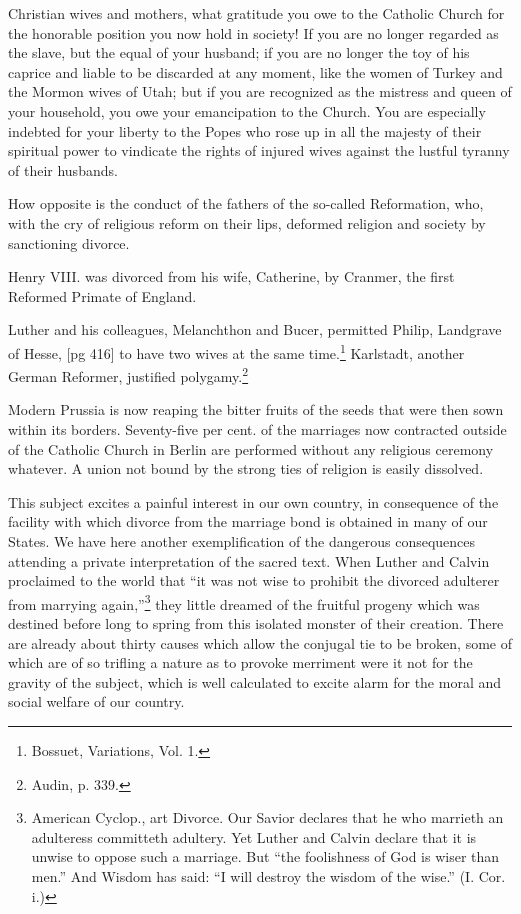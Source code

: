 Christian wives and mothers, what gratitude
you owe to the Catholic Church for the honorable
position you now hold in society! If you are no
longer regarded as the slave, but the equal of
your husband; if you are no longer the toy of his
caprice and liable to be discarded at any moment,
like the women of Turkey and the Mormon wives
of Utah; but if you are recognized as the mistress
and queen of your household, you owe your
emancipation to the Church. You are especially
indebted for your liberty to the Popes who rose
up in all the majesty of their spiritual power to
vindicate the rights of injured wives against the
lustful tyranny of their husbands.

How opposite is the conduct of the fathers of
the so-called Reformation, who, with the cry of
religious reform on their lips, deformed religion
and society by sanctioning divorce.

Henry VIII. was divorced from his wife, Catherine,
by Cranmer, the first Reformed Primate of
England.

Luther and his colleagues, Melanchthon and
Bucer, permitted Philip, Landgrave of Hesse,
[pg 416]
to have two wives at the same time.\footnote{Bossuet,
Variations, Vol. 1.} Karlstadt,
another German Reformer, justified polygamy.\footnote{Audin, p. 339.}

Modern Prussia is now reaping the bitter fruits
of the seeds that were then sown within its borders.
Seventy-five per cent. of the marriages
now contracted outside of the Catholic Church
in Berlin are performed without any religious
ceremony whatever. A union not bound by the
strong ties of religion is easily dissolved.

This subject excites a painful interest in our
own country, in consequence of the facility with
which divorce from the marriage bond is obtained
in many of our States. We have here another
exemplification of the dangerous consequences attending
a private interpretation of the sacred
text. When Luther and Calvin proclaimed to
the world that “it was not wise to prohibit the
divorced adulterer from marrying again,”\footnote{American
Cyclop., art Divorce. Our Savior declares that
he who marrieth an adulteress committeth adultery. Yet
Luther and Calvin declare that it is unwise to oppose such a
marriage. But “the foolishness of God is wiser than men.”
And Wisdom has said: “I will destroy the wisdom of the
wise.” (I. Cor. i.)} they
little dreamed of the fruitful progeny which was
destined before long to spring from this isolated
monster of their creation. There are already
about thirty causes which allow the conjugal tie
to be broken, some of which are of so trifling a
nature as to provoke merriment were it not for
the gravity of the subject, which is well calculated
to excite alarm for the moral and social welfare
of our country.

